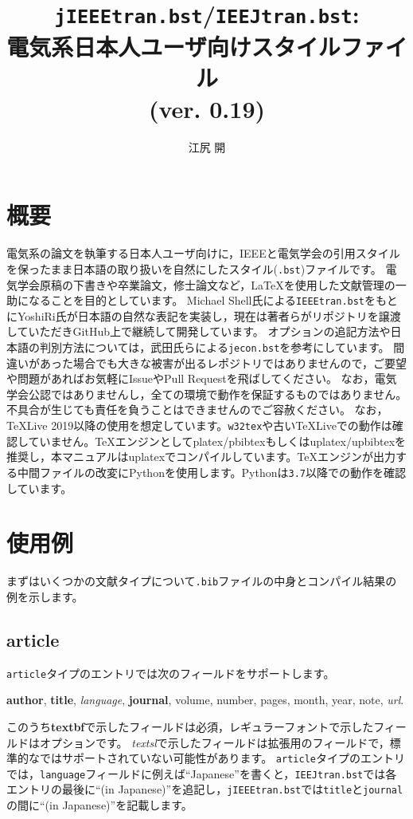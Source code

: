 \documentclass[10pt, a4paper, dvipdfmx, uplatex]{jsarticle} %
\title{\texttt{jIEEEtran.bst}/\texttt{IEEJtran.bst}:\\電気系日本人ユーザ向け\BibTeX スタイルファイル\\(ver. 0.19)}
\author{江尻 開}
\begin{document}
\maketitle
\tableofcontents



\section{概要}
\begin{bibunit}[jIEEEtran]

電気系の論文を執筆する日本人ユーザ向けに，IEEEと電気学会の引用スタイルを保ったまま日本語の取り扱いを自然にした\BibTeX スタイル(\texttt{.bst})ファイルです。
電気学会原稿の下書きや卒業論文，修士論文など，\LaTeX を使用した文献管理の一助になることを目的としています。
Michael Shell氏による\texttt{IEEEtran.bst}\cite{IEEEtran}をもとにYoshiRi氏が日本語の自然な表記を実装し，現在は著者らがリポジトリを譲渡していただきGitHub上\cite{jIEEEtran}で継続して開発しています。
オプションの追記方法や日本語の判別方法については，武田氏らによる\texttt{jecon.bst}\cite{jeconbst}を参考にしています。
間違いがあった場合でも大きな被害が出るレポジトリではありませんので，ご要望や問題があればお気軽にIssueやPull Requestを飛ばしてください。
なお，電気学会公認ではありませんし，全ての環境で動作を保証するものではありません。不具合が生じても責任を負うことはできませんのでご容赦ください。
なお，\TeX Live 2019以降の使用を想定しています。\texttt{w32tex}や古い\TeX Liveでの動作は確認していません。\TeX エンジンとしてplatex/pbibtexもしくはuplatex/upbibtexを推奨し，本マニュアルはuplatexでコンパイルしています。\TeX エンジンが出力する中間ファイルの改変にPythonを使用します。Pythonは\texttt{3.7}以降での動作を確認しています。

{\small \putbib[./ref]}
\end{bibunit}


\section{使用例}
まずはいくつかの文献タイプについて\texttt{.bib}ファイルの中身とコンパイル結果の例を示します。

\subsection{article}

\texttt{article}タイプのエントリでは次のフィールドをサポートします。
\begin{center}
\textbf{author}, \textbf{title}, \textsl{language}, \textbf{journal}, volume, number, pages, month, year, note, \textsl{url}.
\end{center}
このうち\textbf{textbf}で示したフィールドは必須，レギュラーフォントで示したフィールドはオプションです。
\textsl{textsl}で示したフィールドは拡張用のフィールドで，標準的な\BibTeX ではサポートされていない可能性があります。
\texttt{article}タイプのエントリでは，\texttt{language}フィールドに例えば``Japanese''を書くと，\texttt{IEEJtran.bst}では各エントリの最後に``(in Japanese)''を追記し，\texttt{jIEEEtran.bst}では\texttt{title}と\texttt{journal}の間に``(in Japanese)''を記載します。
\end{document}
